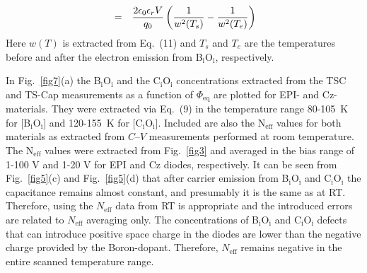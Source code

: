\documentclass[final, 5p, times]{elsarticle}
\begin{document}
\begin{eqnarray} 
[\text{B}_\text{i}\text{O}_\text{i}] & = & {{2  \epsilon_0  \epsilon_r  V} \over {q_0 }} \left({{1} \over {w^2(T_s)}} - {{1} \over {w^2(T_e)}}\right)
\end{eqnarray}
Here $w(T)$ is extracted from Eq.~(11) and $T_s$ and $T_e$ are the temperatures before and after the electron emission from B$_\text{i}$O$_\text{i}$, respectively.
\par
In Fig.~\ref{fig7}(a) the B$_\text{i}$O$_\text{i}$ and the C$_\text{i}$O$_\text{i}$ concentrations extracted from the TSC and TS-Cap measurements as a function of $\si{\Phi_\text{eq}}$ are plotted for EPI- and Cz-materials. They were extracted via Eq.~(9) in the temperature range 80-105~K for [B$_\text{i}$O$_\text{i}$] and 120-155~K for [C$_\text{i}$O$_\text{i}$]. Included are also the N$_\text{eff}$ values for both materials as extracted from $C$--$V$ measurements performed at room temperature. The N$_\text{eff}$ values were extracted from Fig.~\ref{fig3} and averaged in the bias range of 1-100 V and 1-20 V for EPI and Cz diodes, respectively. It can be seen from Fig.~\ref{fig5}(c) and Fig.~\ref{fig5}(d) that after carrier emission from B$_\text{i}$O$_\text{i}$ and C$_\text{i}$O$_\text{i}$ the capacitance remains almost constant, and presumably it is the same as at RT. Therefore, using the $N_\text{eff}$ data from RT is appropriate and the introduced errors are related to $N_\text{eff}$ averaging only. The concentrations of B$_\text{i}$O$_\text{i}$ and C$_\text{i}$O$_\text{i}$ defects that can introduce positive space charge in the diodes are lower than the negative charge provided by the Boron-dopant. Therefore, $N_\text{eff}$ remains negative in the entire scanned temperature range.
\par
\end{document}
